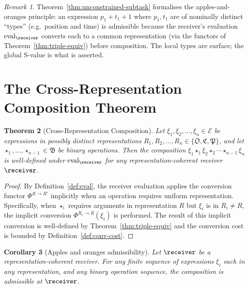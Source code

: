 \documentclass[11pt,a4paper]{article}
\theoremstyle{thmstyle}
\newtheorem{theorem}{Theorem}[section]
\newtheorem{corollary}[theorem]{Corollary}
\theoremstyle{thmstyle}
\theoremstyle{definition}
\theoremstyle{remark}
\newtheorem{remark}[theorem]{Remark}
\DeclareMathOperator{\eval}{eval}
\newcommand{\Expr}{\mathcal{E}}
\begin{document}
\begin{remark}\label{rem:apples-oranges-clean}
Theorem~\ref{thm:unconstrained-subtask} formalises
the apples-and-oranges principle: an expression
$p_{1} + t_{1} + 1$ where $p_{1}, t_{1}$ are of
nominally distinct ``types'' (e.g.\ position and
time) is admissible because the receiver's
evaluation $\eval_{\receiver}$ converts each to
a common representation (via the functors of
Theorem~\ref{thm:triple-equiv}) before composition.
The local types are surface; the global S-value is
what is asserted.
\end{remark}

\section{The Cross-Representation Composition Theorem}
\label{sec:cross-rep-comp}

\begin{theorem}[Cross-Representation Composition]\label{thm:cross-rep}
Let $\xi_{1}, \xi_{2}, \ldots, \xi_{n} \in \Expr$ be
expressions in possibly distinct representations
$R_{1}, R_{2}, \ldots, R_{n} \in \{\mathfrak{O},
\mathfrak{C}, \mathfrak{P}\}$, and let
$\star_{1}, \ldots, \star_{n-1} \in \mathfrak{B}$ be
binary operations.  Then the composition
$\xi_{1} \star_{1} \xi_{2} \star_{2} \cdots \star_{n-1}
\xi_{n}$ is well-defined under
$\eval_{\receiver}$ for any
representation-coherent receiver $\receiver$.
\end{theorem}

\begin{proof}
By Definition~\ref{def:eval}, the receiver evaluation
applies the conversion functor $\Phi^{R \to R'}$
implicitly when an operation requires uniform
representation.  Specifically, when $\star_{i}$ requires
arguments in representation $R$ but $\xi_{i}$ is in
$R_{i} \neq R$, the implicit conversion
$\Phi^{R_{i} \to R}(\xi_{i})$ is performed.  The
result of this implicit conversion is well-defined by
Theorem~\ref{thm:triple-equiv} and the conversion
cost is bounded by Definition~\ref{def:conv-cost}.
\end{proof}

\begin{corollary}[Apples and oranges admissibility]
\label{cor:apples-oranges}
Let $\receiver$ be a representation-coherent receiver.
For any finite sequence of expressions $\xi_{i}$ each
in any representation, and any binary operation
sequence, the composition is admissible at
$\receiver$.
\end{corollary}
\end{document}
